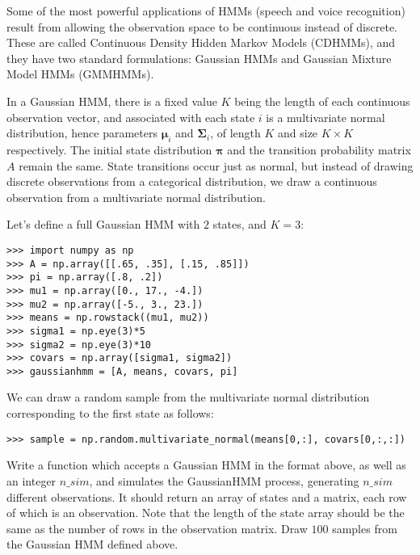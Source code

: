 
Some of the most powerful applications of HMMs (speech and voice recognition) result from allowing the observation space to be continuous instead of discrete.  These are called Continuous Density Hidden Markov Models (CDHMMs), and they have two standard formulations: Gaussian HMMs and Gaussian Mixture Model HMMs (GMMHMMs).

In a Gaussian HMM, there is a fixed value $K$ being the length of each continuous observation vector, and associated with each state $i$ is a multivariate normal distribution, hence parameters $\mathbf{\mu}_{i}$ and $\mathbf{\Sigma}_{i}$, of length $K$ and size $K \times K$ respectively. The initial state distribution $\mathbf{\pi}$ and the transition probability matrix $A$ remain the same. State transitions occur just as normal, but instead of drawing discrete observations from a categorical distribution, we draw a continuous observation from a multivariate normal distribution.

Let's define a full Gaussian HMM with $2$ states, and $K=3$:
\begin{lstlisting}
>>> import numpy as np
>>> A = np.array([[.65, .35], [.15, .85]])
>>> pi = np.array([.8, .2])
>>> mu1 = np.array([0., 17., -4.])
>>> mu2 = np.array([-5., 3., 23.])
>>> means = np.rowstack((mu1, mu2))
>>> sigma1 = np.eye(3)*5
>>> sigma2 = np.eye(3)*10
>>> covars = np.array([sigma1, sigma2])
>>> gaussianhmm = [A, means, covars, pi]
\end{lstlisting}
We can draw a random sample from the multivariate normal distribution corresponding to the first state as follows:

\begin{lstlisting}
>>> sample = np.random.multivariate_normal(means[0,:], covars[0,:,:])
\end{lstlisting}

\begin{problem}
Write a function which accepts a Gaussian HMM in the format above, as well as an integer $n\_sim$, and simulates the GaussianHMM process, generating $n\_sim$ different observations. It should return an array of states and a matrix, each row of which is an observation. Note that the length of the state array should be the same as the number of rows in the observation matrix. Draw $100$ samples from the Gaussian HMM defined above.
\end{problem}

